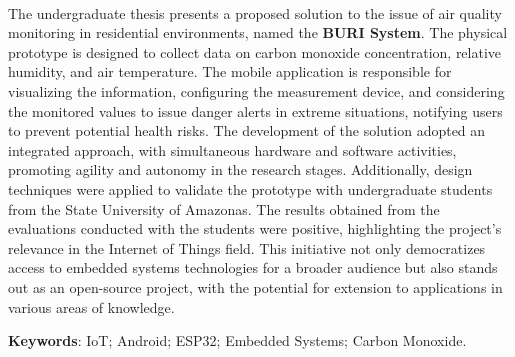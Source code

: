 \ \ \\[2cm]
The undergraduate thesis presents a proposed solution to the issue of air quality monitoring 
in residential environments, named the \textbf{BURI System}. The physical prototype is designed to collect 
data on carbon monoxide concentration, relative humidity, and air temperature. The mobile application is responsible 
for visualizing the information, configuring the measurement device, and considering the monitored values to issue danger 
alerts in extreme situations, notifying users to prevent potential health risks. The development of the solution adopted an
integrated approach, with simultaneous hardware and software activities, promoting agility and autonomy in the research stages. 
Additionally, design techniques were applied to validate the prototype with undergraduate students from the State University of Amazonas. 
The results obtained from the evaluations conducted with the students were positive, highlighting the project's relevance in the Internet of Things 
field. This initiative not only democratizes access to embedded systems technologies for a broader audience but also stands out as an open-source project, 
with the potential for extension to applications in various areas of knowledge.

\noindent \textbf{Keywords}:  IoT; Android; ESP32; Embedded Systems; Carbon Monoxide.
